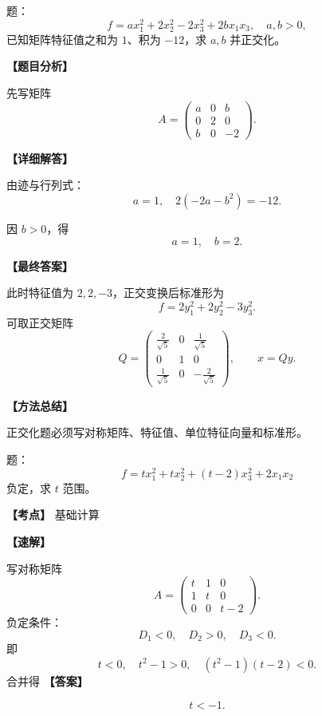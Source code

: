 ﻿\documentclass[11pt,a4paper,UTF8]{ctexart}
\begin{document}
\begin{answerbox}
题：
\[f=ax_1^2+2x_2^2-2x_3^2+2bx_1x_3,\quad a,b>0,\]
已知矩阵特征值之和为 $1$、积为 $-12$，求 $a,b$ 并正交化。

\textbf{【题目分析】}

先写矩阵
\[A=\begin{pmatrix}a&0&b\\0&2&0\\b&0&-2\end{pmatrix}.\]

\textbf{【详细解答】}

由迹与行列式：
\[a=1,\quad 2(-2a-b^2)=-12.\]

因 $b>0$，得
\[a=1,\quad b=2.\]

\textbf{【最终答案】}

此时特征值为 $2,2,-3$，正交变换后标准形为
\[f=2y_1^2+2y_2^2-3y_3^2.\]
可取正交矩阵
\[
Q=
\begin{pmatrix}
\frac2{\sqrt5}&0&\frac1{\sqrt5}\\
0&1&0\\
\frac1{\sqrt5}&0&-\frac2{\sqrt5}
\end{pmatrix},
\qquad x=Qy.
\]

\textbf{【方法总结】}

正交化题必须写对称矩阵、特征值、单位特征向量和标准形。
\end{answerbox}
\begin{answerbox}[2022--2023 填空 6]
题：
\[f=tx_1^2+tx_2^2+(t-2)x_3^2+2x_1x_2\]
负定，求 $t$ 范围。

\textbf{【考点】} 基础计算

\textbf{【速解】}

写对称矩阵
\[A=\begin{pmatrix}t&1&0\\1&t&0\\0&0&t-2\end{pmatrix}.\]
负定条件：
\[D_1<0,\quad D_2>0,\quad D_3<0.\]
即
\[t<0,\quad t^2-1>0,\quad (t^2-1)(t-2)<0.\]
合并得
\textbf{【答案】}

\[t<-1.\]
\end{answerbox}
\end{document}
